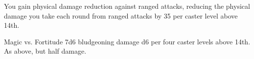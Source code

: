 \begin{spellheader}
\end{spellheader}
\begin{spellcontent}
    \begin{spelltargetinginfo}
    \end{spelltargetinginfo}
    \begin{spelleffects}
        \spelleffect You gain physical damage reduction against ranged attacks, reducing the physical damage you take each round from ranged attacks by 35  per caster level above 14th.
        \spelldur{\durshort \dismissable}
    \end{spelleffects}
\end{spellcontent}
\begin{spellsubcontent}
    \begin{spelltargetinginfo}
    \end{spelltargetinginfo}
    \begin{spelleffects}
        \begin{spellattack}{Magic vs. Fortitude}
            \spellsuccess 7d6 bludgeoning damage \add d6 per four caster levels above 14th.
            \spellfailure As above, but half damage.
        \end{spellattack}
    \end{spelleffects}
\end{spellsubcontent}
\begin{spellfooter}

\end{spellfooter}

